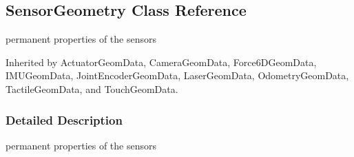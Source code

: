 \hypertarget{classOpenRAVE_1_1SensorBase_1_1SensorGeometry}{
\subsection{SensorGeometry Class Reference}
\label{classOpenRAVE_1_1SensorBase_1_1SensorGeometry}
}


permanent properties of the sensors  




Inherited by ActuatorGeomData, CameraGeomData, Force6DGeomData, IMUGeomData, JointEncoderGeomData, LaserGeomData, OdometryGeomData, TactileGeomData, and TouchGeomData.



\subsubsection{Detailed Description}
permanent properties of the sensors 